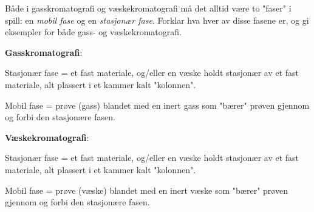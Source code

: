 

Både i gasskromatografi og væskekromatografi må det alltid være to "faser" i spill: en {\it mobil fase} og en {\it stasjonær fase}. Forklar hva hver av disse fasene er, og gi eksempler for både gass- og væskekromatografi.







\noindent
{\bf Gasskromatografi}:

\vskip 10pt

Stasjonær fase = et fast materiale, og/eller en væske holdt stasjonær av et fast materiale, alt plassert i et kammer kalt "kolonnen".

\vskip 10pt

Mobil fase = prøve (gass) blandet med en inert gass som "bærer" prøven gjennom og forbi den stasjonære fasen.

\vskip 40pt

\noindent
{\bf Væskekromatografi}:

\vskip 10pt

Stasjonær fase = et fast materiale, og/eller en væske holdt stasjonær av et fast materiale, alt plassert i et kammer kalt "kolonnen".

\vskip 10pt

Mobil fase = prøve (væske) blandet med en inert væske som "bærer" prøven gjennom og forbi den stasjonære fasen.









